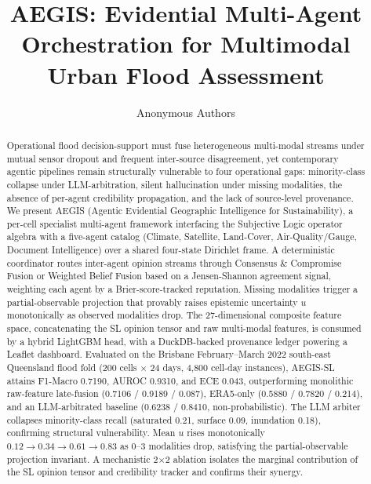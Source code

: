 \documentclass[a4paper,fleqn]{cas-dc}
\begin{document}
\let\WriteBookmarks\relax
\def\floatpagepagefraction{1}
\def\textpagefraction{0.001}


\title[mode=title]{AEGIS: Evidential Multi-Agent Orchestration for Multimodal Urban Flood Assessment}


\author[1]{Anonymous Authors}

\address[1]{Department of Computer Science / Engineering, Anonymous University}

\begin{abstract}
Operational flood decision-support must fuse heterogeneous multi-modal streams under mutual sensor dropout and frequent inter-source disagreement, yet contemporary agentic pipelines remain structurally vulnerable to four operational gaps: minority-class collapse under LLM-arbitration, silent hallucination under missing modalities, the absence of per-agent credibility propagation, and the lack of source-level provenance. We present AEGIS (Agentic Evidential Geographic Intelligence for Sustainability), a per-cell specialist multi-agent framework interfacing the Subjective Logic operator algebra with a five-agent catalog (Climate, Satellite, Land-Cover, Air-Quality/Gauge, Document Intelligence) over a shared four-state Dirichlet frame. A deterministic coordinator routes inter-agent opinion streams through Consensus \& Compromise Fusion or Weighted Belief Fusion based on a Jensen-Shannon agreement signal, weighting each agent by a Brier-score-tracked reputation. Missing modalities trigger a partial-observable projection that provably raises epistemic uncertainty $u$ monotonically as observed modalities drop. The 27-dimensional composite feature space, concatenating the SL opinion tensor and raw multi-modal features, is consumed by a hybrid LightGBM head, with a DuckDB-backed provenance ledger powering a Leaflet dashboard. Evaluated on the Brisbane February--March 2022 south-east Queensland flood fold (200 cells $\times$ 24 days, 4,800 cell-day instances), AEGIS-SL attains F1-Macro 0.7190, AUROC 0.9310, and ECE 0.043, outperforming monolithic raw-feature late-fusion (0.7106 / 0.9189 / 0.087), ERA5-only (0.5880 / 0.7820 / 0.214), and an LLM-arbitrated baseline (0.6238 / 0.8410, non-probabilistic). The LLM arbiter collapses minority-class recall (saturated 0.21, surface 0.09, inundation 0.18), confirming structural vulnerability. Mean $u$ rises monotonically $0.12 \to 0.34 \to 0.61 \to 0.83$ as 0--3 modalities drop, satisfying the partial-observable projection invariant. A mechanistic 2$\times$2 ablation isolates the marginal contribution of the SL opinion tensor and credibility tracker and confirms their synergy.
\end{abstract}
\end{document}
